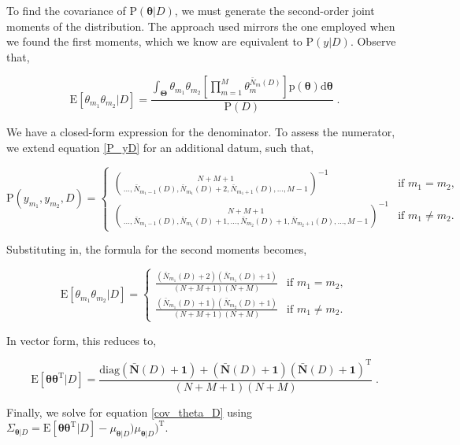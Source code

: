 \documentclass[12pt]{article}
\begin{document}
To find the covariance of $\text{P}(\bm{\theta}|D)$, we must generate the second-order joint moments of the distribution. The approach used mirrors the one employed when we found the first moments, which we know are equivalent to $\text{P}(y|D)$. Observe that,

\begin{equation}
\text{E}[\theta_{m_1} \theta_{m_2} | D] = \frac{\int_{\bm{\Theta}} \theta_{m_1} \theta_{m_2} \left[ \prod_{m=1}^M \theta_m^{\bar{N}_m(D)} \right] \text{p}(\bm{\theta}) \mathrm{d}\bm{\theta}}{\text{P}(D)} \;.
\end{equation}

We have a closed-form expression for the denominator. To assess the numerator, we extend equation \eqref{P_yD} for an additional datum, such that,

\begin{equation}
\text{P}(y_{m_1},y_{m_2},D) = 
\begin{cases}
\binom{N+M+1}{\ldots,\bar{N}_{m_1-1}(D),\bar{N}_{m_1}(D)+2,\bar{N}_{m_1+1}(D),\ldots,M-1}^{-1} & \text{if } m_1 = m_2, \\ 
\binom{N+M+1}{\ldots,\bar{N}_{m_1-1}(D),\bar{N}_{m_1}(D)+1,\ldots,\bar{N}_{m_2}(D)+1,\bar{N}_{m_2+1}(D),\ldots,M-1}^{-1} & \text{if } m_1 \neq m_2.
\end{cases}
\end{equation}

Substituting in, the formula for the second moments becomes,

\begin{equation}
\text{E}[\theta_{m_1} \theta_{m_2} | D] =
\begin{cases}
\frac{(\bar{N}_{m_1}(D)+2)(\bar{N}_{m_1}(D)+1)}{(N+M+1)(N+M)} & \text{if } m_1 = m_2, \\  
\frac{(\bar{N}_{m_1}(D)+1)(\bar{N}_{m_2}(D)+1)}{(N+M+1)(N+M)} & \text{if } m_1 \neq m_2.
\end{cases}
\end{equation}

In vector form, this reduces to,

\begin{equation}
\text{E}[\bm{\theta} \bm{\theta}^\text{T} | D] = \frac{\text{diag}(\bar{\bm{N}}(D) + \bm{1}) + (\bar{\bm{N}}(D) + \bm{1}) (\bar{\bm{N}}(D) + \bm{1})^\text{T}}{(N+M+1)(N+M)} \;.
\end{equation}

Finally, we solve for equation \eqref{cov_theta_D} using $\Sigma_{\bm{\theta} | D} = \text{E}[\bm{\theta} \bm{\theta}^\text{T} | D] -  \mu_{\bm{\theta} | D}) \mu_{\bm{\theta} | D})^\text{T}$.
\end{document}
